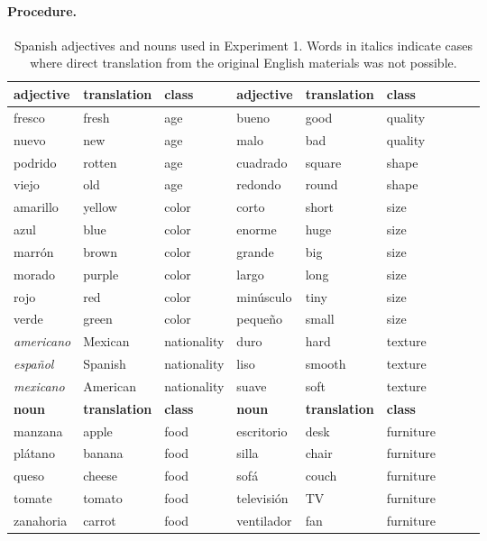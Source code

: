 \documentclass[12pt,letterpaper]{article}
\begin{document}
\paragraph{Procedure.}

\begin{table}
	\centering
	{
		\begin{tabular}{lllllllll} \toprule
			\textbf{adjective}  & \textbf{translation} & \textbf{class} &  \textbf{adjective}  & \textbf{translation} & \textbf{class}\\ \midrule
			fresco & fresh & age & bueno & good & quality \\
			nuevo & new & age & malo & bad & quality \\
			podrido & rotten & age & cuadrado & square & shape  \\
			viejo & old & age & redondo & round & shape  \\
			amarillo & yellow & color & corto & short & size \\
			azul & blue & color & enorme & huge & size  \\
			marr\'{o}n & brown & color & grande & big & size \\
			morado & purple & color & largo & long & size \\
			rojo & red & color & min\'{u}sculo & tiny & size \\
			verde & green & color & peque\~{n}o & small & size  \\
			\textit{americano} & Mexican & nationality & duro & hard & texture \\
			\textit{espa\~{n}ol} & Spanish & nationality & liso & smooth & texture \\
			\textit{mexicano} & American & nationality & suave & soft & texture \\ \midrule
			\textbf{noun} & \textbf{translation} & \textbf{class} & \textbf{noun} & \textbf{translation} & \textbf{class}\\ \midrule
			manzana & apple & food &  escritorio & desk & furniture \\
			pl\'{a}tano & banana & food & silla & chair & furniture \\
			queso & cheese & food & sof\'{a} & couch & furniture \\
			tomate & tomato & food & televisi\'{o}n & TV & furniture \\
			zanahoria & carrot & food & ventilador & fan & furniture \\ \bottomrule
		\end{tabular}
		\caption{Spanish adjectives and nouns used in Experiment 1. Words in italics indicate cases where direct translation from the original English materials was not possible.}
		\label{spanish-materials}
	}
\end{table}
\end{document}
